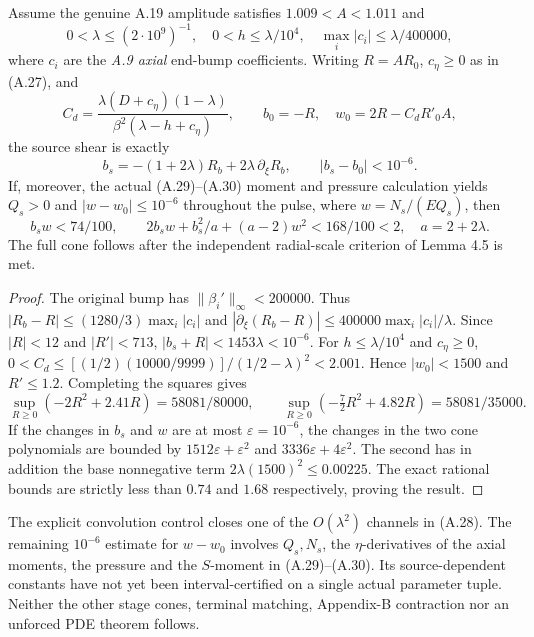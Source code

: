 \begin{proposition}
\label{prop:A5-quantified-source-cone}
Assume the genuine A.19 amplitude satisfies
$1.009<A<1.011$ and
\[
0<\lambda\le(2\cdot10^9)^{-1},\quad
0<h\le\lambda/10^4,\quad
\max_i|c_i|\le\lambda/400000,
\]
where $c_i$ are the \emph{A.9 axial} end-bump coefficients.
Writing $R=AR_0$, $c_\eta\ge0$ as in (A.27), and
\[
 C_d=\frac{\lambda(D+c_\eta)(1-\lambda)}
 {\beta^2(\lambda-h+c_\eta)},\qquad
 b_0=-R,\quad w_0=2R-C_dR'_0A,
\]
the source shear is exactly
\[
 b_s=-(1+2\lambda)R_b+2\lambda\,\partial_\xi R_b,\qquad
 |b_s-b_0|<10^{-6}.
\]
If, moreover, the actual (A.29)--(A.30) moment and pressure
calculation yields
$Q_s>0$ and $|w-w_0|\le10^{-6}$ throughout the pulse,
where $w=N_s/(EQ_s)$, then
\begin{equation}\label{eq:A5-quantified-cone}
 b_sw<74/100,\qquad
 2b_sw+b_s^2/a+(a-2)w^2<168/100<2,\quad a=2+2\lambda.
\end{equation}
The full cone follows after the independent radial-scale
criterion of Lemma 4.5 is met.
\end{proposition}
\begin{proof}
The original bump has $\|\beta_i'\|_\infty<200000$.
Thus $|R_b-R|\le(1280/3)\max_i|c_i|$ and
$|\partial_\xi(R_b-R)|\le400000\max_i|c_i|/\lambda$.
Since $|R|<12$ and $|R'|<713$,
$|b_s+R|<1453\lambda<10^{-6}$.
For $h\le\lambda/10^4$ and $c_\eta\ge0$,
$0<C_d\le[(1/2)(10000/9999)]/(1/2-\lambda)^2
<2.001$. Hence $|w_0|<1500$ and $R'\le1.2$.
Completing the squares gives
\[
 \sup_{R\ge0}(-2R^2+2.41R)=58081/80000,\qquad
 \sup_{R\ge0}(-\tfrac72R^2+4.82R)=58081/35000.
\]
If the changes in $b_s$ and $w$ are at most
$\varepsilon=10^{-6}$, the changes in the two cone
polynomials are bounded by
$1512\varepsilon+\varepsilon^2$ and
$3336\varepsilon+4\varepsilon^2$.
The second has in addition the base nonnegative term
$2\lambda(1500)^2\le0.00225$.
The exact rational bounds are strictly less than
$0.74$ and $1.68$ respectively, proving the result.
\end{proof}

The explicit convolution control closes one of the $O(\lambda^2)$
channels in (A.28). The remaining $10^{-6}$ estimate for
$w-w_0$ involves $Q_s,N_s$, the $\eta$-derivatives
of the axial moments, the pressure and the $S$-moment
in (A.29)--(A.30). Its source-dependent constants have not
yet been interval-certified on a single actual parameter
tuple. Neither the other stage cones, terminal matching,
Appendix-B contraction nor an unforced PDE theorem follows.
